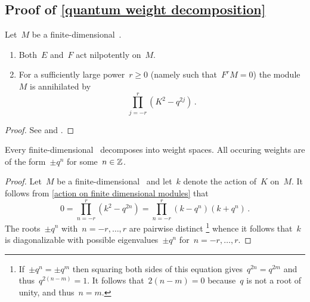 \documentclass[a4paper, 11pt, oneside]{scrartcl}
\begin{document}



\subsection{Proof of \cref{quantum weight decomposition}}
\label{proof of quantum weight decomposition}

\begin{lemma}
  \label{action on finite dimensional modules}
  Let~$M$ be a finite-dimensional~.
  \begin{enumerate}
    \item
      Both~$E$ and~$F$ act nilpotently on~$M$.
    \item
      For a sufficiently large power~$r \geq 0$ (namely such that~$F^r M = 0$) the module~$M$ is annihilated by
      \[
        \prod_{j = -r}^r (K^2 - q^{2j}) \,.
      \]
  \end{enumerate}
\end{lemma}

\begin{proof}
  See \cite[Proposition~2.1]{jantzen_quantum} and \cite[Proposition~2.3]{jantzen_quantum}.
\end{proof}

\begin{proposition}
  Every finite-dimensional~ decomposes into weight spaces.
  All occuring weights are of the form~$\pm q^n$ for some~$n \in \mathbb{Z}$.
\end{proposition}

\begin{proof}
  Let~$M$ be a finite-dimensional~ and let~$k$ denote the action of~$K$ on~$M$.
  It follows from \cref{action on finite dimensional modules} that
  \[
    0
    =
    \prod_{n = -r}^r ( k^2 - q^{2n} )
    =
    \prod_{n = -r}^r ( k - q^n ) ( k + q^n ) \,.
  \]
  The roots~$\pm q^n$ with~$n = -r, \dotsc, r$ are pairwise distinct%
  \footnote{
    If~$\pm q^n = \pm q^m$ then squaring both sides of this equation gives~$q^{2n} = q^{2m}$ and thus~$q^{2(n-m)} = 1$.
    It follows that~$2(n-m) = 0$ because~$q$ is not a root of unity, and thus~$n = m$.
  }
  whence it follows that~$k$ is diagonalizable with possible eigenvalues~$\pm q^n$ for~$n = -r, \dotsc, r$.
\end{proof}
\end{document}
